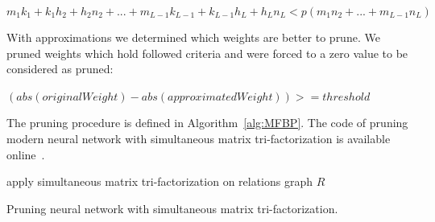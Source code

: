 \documentclass{article} %
\begin{document}
\begin{equation} \label{eq:2}
 m_1k_1 + k_1h_2 + h_2n_2 + ... + m_{L-1}k_{L-1} + k_{L-1}h_L + h_Ln_L < p(m_1n_2 + ... + m_{L-1}n_L)
\end{equation}



With approximations we determined which weights are better to prune. We pruned
weights which hold followed criteria and were forced to a zero value to be
considered as pruned:

$(abs(originalWeight) - abs(approximatedWeight)) >= threshold$



The pruning procedure is defined in Algorithm~\ref{alg:MFBP}.
The code of pruning modern neural network with simultaneous matrix 
tri-factorization is available online~\cite{code}.


\begin{algorithm}[H]
\label{alg:MFBP}
 apply simultaneous matrix tri-factorization on relations graph $R$\;
 \caption{Pruning neural network with simultaneous matrix tri-factorization.}
 
\end{algorithm}
	
\end{document}
